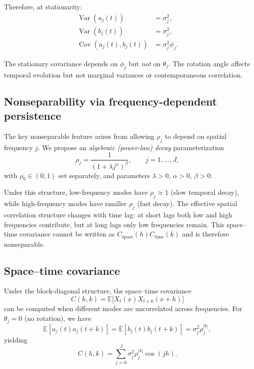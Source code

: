 \documentclass[answers,12pt,addpoints]{exam}
\begin{document}
Therefore, at stationarity:
\begin{align}
  \operatorname{Var}(a_j(t)) &= \sigma_j^2, \\
  \operatorname{Var}(b_j(t)) &= \sigma_j^2, \\
  \operatorname{Cov}(a_j(t), b_j(t)) &= \sigma_j^2 \phi_j.
\end{align}

The stationary covariance depends on $\phi_j$ but \emph{not} on $\theta_j$. The rotation angle affects temporal evolution but not marginal variances or contemporaneous correlation.

\subsection{Nonseparability via frequency-dependent persistence}

The key nonseparable feature arises from allowing $\rho_j$ to depend on spatial frequency $j$. We propose an \emph{algebraic (power-law) decay} parameterization
\begin{equation}
  \rho_j
  =
  \frac{1}{(1 + \lambda j^\alpha)^\beta},
  \qquad j = 1,\dots,J,
  \label{eq:rhoj-algebraic}
\end{equation}
with $\rho_0 \in (0,1)$ set separately, and parameters $\lambda > 0$, $\alpha > 0$, $\beta > 0$.


Under this structure, low-frequency modes have $\rho_j \approx 1$ (slow temporal decay), while high-frequency modes have smaller $\rho_j$ (fast decay). The effective spatial correlation structure changes with time lag: at short lags both low and high frequencies contribute, but at long lags only low frequencies remain. This space--time covariance cannot be written as $C_{\text{space}}(h) C_{\text{time}}(k)$ and is therefore nonseparable.

\subsection{Space--time covariance}

Under the block-diagonal structure, the space--time covariance
\[
  C(h,k) = \mathbb{E}\bigl[ X_t(x) X_{t+k}(x+h) \bigr]
\]
can be computed when different modes are uncorrelated across frequencies. For $\theta_j = 0$ (no rotation), we have
\[
  \mathbb{E}[a_j(t)a_j(t+k)] = \mathbb{E}[b_j(t)b_j(t+k)] = \sigma_j^2 \rho_j^{|k|},
\]
yielding
\begin{equation}
  C(h,k)
  =
  \sum_{j=0}^{J}
  \sigma_j^2 \rho_j^{|k|} \cos(jh).
  \label{eq:cov-fourier-ar1}
\end{equation}
\end{document}
